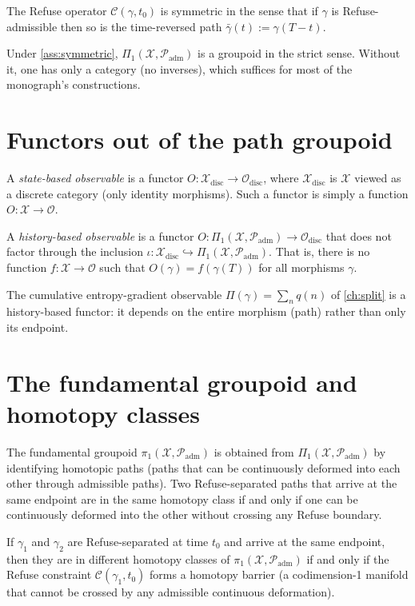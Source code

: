 \documentclass[12pt, oneside]{memoir}
\newcommand{\X}{\mathcal{X}}
\newcommand{\OO}{\mathcal{O}}
\newcommand{\Padm}{\mathcal{P}_{\mathrm{adm}}}
\begin{document}
\begin{assumption}
\label{ass:symmetric}
The Refuse operator $\mathcal{C}(\gamma, t_0)$ is symmetric in the sense that if
$\gamma$ is Refuse-admissible then so is the time-reversed path $\bar\gamma(t) :=
\gamma(T-t)$.
\end{assumption}

Under \cref{ass:symmetric}, $\Pi_1(\X, \Padm)$ is a groupoid in the strict sense.
Without it, one has only a category (no inverses), which suffices for most of the
monograph's constructions.

\section{Functors out of the path groupoid}

\begin{definition}
A \emph{state-based observable} is a functor $O: \X_{\mathrm{disc}} \to \OO_{\mathrm{disc}}$,
where $\X_{\mathrm{disc}}$ is $\X$ viewed as a discrete category (only identity
morphisms).  Such a functor is simply a function $O: \X \to \OO$.

A \emph{history-based observable} is a functor $O: \Pi_1(\X, \Padm) \to \OO_{\mathrm{disc}}$
that does not factor through the inclusion $\iota: \X_{\mathrm{disc}} \hookrightarrow
\Pi_1(\X, \Padm)$.  That is, there is no function $f: \X \to \OO$ such that
$O(\gamma) = f(\gamma(T))$ for all morphisms $\gamma$.
\end{definition}

The cumulative entropy-gradient observable $\Pi(\gamma) = \sum_n q(n)$ of
\cref{ch:split} is a history-based functor: it depends on the entire morphism (path)
rather than only its endpoint.

\section{The fundamental groupoid and homotopy classes}

The fundamental groupoid $\pi_1(\X, \Padm)$ is obtained from $\Pi_1(\X, \Padm)$ by
identifying homotopic paths (paths that can be continuously deformed into each other
through admissible paths).  Two Refuse-separated paths that arrive at the same endpoint
are in the same homotopy class if and only if one can be continuously deformed into the
other without crossing any Refuse boundary.

\begin{proposition}
\label{prop:homotopy}
If $\gamma_1$ and $\gamma_2$ are Refuse-separated at time $t_0$ and arrive at the same
endpoint, then they are in different homotopy classes of $\pi_1(\X, \Padm)$ if and only
if the Refuse constraint $\mathcal{C}(\gamma_1, t_0)$ forms a homotopy barrier (a
codimension-1 manifold that cannot be crossed by any admissible continuous deformation).
\end{proposition}
\end{document}
